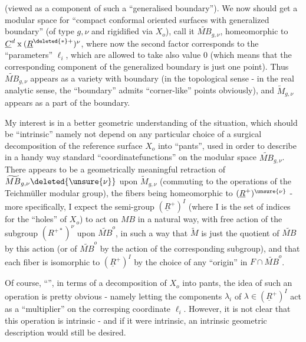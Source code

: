 (viewed as a component of such a ``generalised boundary''). We now should  get a modular space for ``compact conformal oriented surfaces with generalized boundary'' (of type $g,\nu$ and rigidified via $X_o$), call it $\widetilde{MB}_{g,\nu}$, homeomorphic to $\underline C^d\mathbin{\mathrm{x}}(\underline R^{\deleted{*}+})^{\nu}$, where now the second factor corresponds to  the ``parameters'' $\ell_i$, which are allowed to take also value $0$ (which means that the corresponding component of the generalized boundary is just one point). Thus $\widetilde{MB}_{g,\nu}$ appears as a variety with boundary (in the topological sense - in the real analytic sense, the ``boundary'' admits ``corner-like'' points obviously), and $\widetilde M_{g,\nu}$ appears as a part of the boundary.

My interest is in a better geometric understanding of the situation, which should be ``intrinsic'' namely not depend on any particular choice of a surgical decomposition of the reference surface $X_o$ into ``pants'', used in order to describe in a handy way  standard ``coordinatefunctions'' on the modular space $\widetilde{MB}_{g,\nu}$. There appears to be a geometrically meaningful retraction of $\widetilde{MB}_{g,\nu}\deleted{\unsure{\nu}}$ upon $\widetilde M_{g,\nu}$ (commuting to the operations of the Teichmüller modular group), the fibers being homeomorphic to $(\underline R^+)^{\unsure{\nu}}$ - more specifically, I expect the semi-group $(\underline R^+)^I$ (where I is the set of indices for the ``holes'' of $X_o$) to act on $MB$ in a natural way, with free action of the subgroup $(R^{+*})^{\nu}$ upon $\widetilde{MB}^{o}$, in such a way that $\widetilde M$ is just the quotient of $\widetilde{MB}$ by this action (or of $\widetilde{MB}^{o}$ by the action of the  corresponding subgroup), and that each fiber is isomorphic to $(\underline R^+)^I$ by the choice of any ``origin'' in $F\cap\widetilde{MB}^{o}$.

Of course, ``'', in terms of a decomposition of $X_o$ into pants, the idea of such an operation is pretty obvious - namely letting the components $\lambda_i$ of $\lambda\in(\underline R^+)^I$ act as a ``multiplier'' on the corresping coordinate $\ell_i$. However, it is not clear that this operation is intrinsic - and if it were intrinsic, an intrinsic geometric description would still be  desired.

